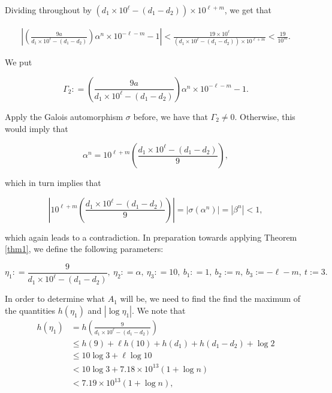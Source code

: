\documentclass[10pt,a4paper]{article}
\begin{document}
\noindent Dividing throughout by $(d_1 \times 10^\ell - (d_1-d_2))\times 10^{\ell+m}$, we get that

\begin{align}\label{eq6}
\left|\left(\frac{9a}{d_1 \times 10^\ell - (d_1-d_2)} \right) \alpha^n  \times 10^{-\ell - m}  -1 \right|  < \frac{19 \times 10^\ell}{(d_1 \times 10^\ell - (d_1-d_2))\times 10^{\ell+m}}   < \frac{19}{10^m}.
\end{align}

\noindent We put

\begin{equation*}
\Gamma_2: = \left(\frac{9a}{d_1 \times 10^\ell - (d_1-d_2)} \right) \alpha^n \times 10^{-\ell -m} - 1.
\end{equation*}

\noindent Apply the Galois automorphism $ \sigma $ before, we have that $\Gamma_2 \neq 0$. Otherwise,  this would imply that 

\begin{equation*}
 \alpha^n = 10^{\ell + m}  \left(\frac{d_1 \times 10^\ell - (d_1-d_2)}{9} \right),
\end{equation*}

\noindent which in turn implies that

\begin{equation*}
\left| 10^{\ell + m}  \left(\frac{d_1 \times 10^\ell - (d_1-d_2)}{9} \right) \right| = |\sigma( \alpha^n)| = | \beta^n | < 1,
\end{equation*}


\noindent which again leads to a contradiction. In preparation towards applying Theorem \ref{thm1}, we define the following parameters:

\begin{equation*}
\eta_1: = \frac{9}{d_1 \times 10^\ell - (d_1-d_2)} , \ \eta_2: = \alpha, \ \eta_3: = 10, \ b_1: = 1, \ b_2 := n, \ b_3 := -\ell - m, \ t := 3.
\end{equation*}

\noindent In order to determine what $A_1$ will be, we need to find the find the maximum of the quantities $h(\eta_1)$ and $|\log \eta_1|$. We note that
\begin{align*}
h(\eta_1) & = h \left(\frac{9}{d_1 \times 10^\ell - (d_1-d_2)} \right)\\
& \leq  h(9) + \ell h(10) +h(d_1) + h(d_1-d_2) + \log 2\\
& \leq 10 \log 3 + \ell \log 10\\
& < 10\log 3 + 7.18\times 10^{13} (1+ \log n)\\
& < 7.19\times 10^{13}(1 + \log n),
\end{align*}
\end{document}
